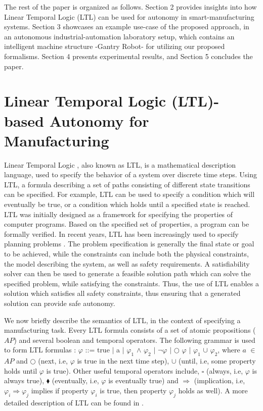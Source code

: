 \documentclass[3p,twocolumn,times,procedia]{elsarticle}
\begin{document}
The rest of the paper is organized as follows. Section 2  provides insights into how Linear Temporal Logic (LTL) can be used for autonomy in smart-manufacturing systems. Section 3  showcases an example use-case of the proposed approach, in an autonomous industrial-automation laboratory setup, which contains an intelligent machine structure -Gantry Robot- for utilizing our proposed formalisms. Section 4 presents experimental results, and Section 5 concludes the paper.
\vspace{-10pt}
\section{Linear Temporal Logic (LTL)-based Autonomy for Manufacturing} \label{sec:ltl-autonomy}
Linear Temporal Logic \cite{LTL}, also known as LTL, is a mathematical description language, used to specify the behavior of a system over discrete time steps. Using LTL, a formula describing a set of paths consisting of different state transitions can be specified. For example, LTL can be used to specify a condition which will eventually be true, or a condition which holds until a specified state is reached. LTL was initially designed as a framework for specifying the properties of computer programs. Based on the specified set of properties, a program can be formally verified. In recent years, LTL has been increasingly used to specify planning problems \cite{ltl-planning}. The problem specification is generally the final state or goal to be achieved, while the constraints can include both the physical constraints, the model describing the system, as well as safety requirements. A satisfiability solver can then be used to generate a feasible solution path which can solve the specified problem, while satisfying the constraints. %
Thus, the use of LTL enables a solution which satisfies all safety constraints, thus ensuring that a generated solution can provide safe autonomy.

We now briefly describe the semantics of LTL, in the context of specifying a manufacturing task.  Every LTL formula consists of a set of atomic propositions ($AP$) and several boolean and temporal operators. The following grammar is used to form LTL formulas \cite{model-book}: $\varphi$ ::= true $|$ a $|$ $\varphi_1$ $\wedge$ $\varphi_2$ $|$ $\neg$$\varphi$ $|$ $\bigcirc$ $\varphi$ $|$ $\varphi_1$ $\cup$ $\varphi_2$, where $a$ $\in$ $AP$ and $\bigcirc$ (next, i.e, $\varphi$ is true in the next time step), $\cup$ (until, i.e, some property holds until $\varphi$ is true). Other useful temporal operators include, $\square$  (always, i.e, $\varphi$ is always true), $\blacklozenge$ (eventually, i.e, $\varphi$ is eventually true) and $\Rightarrow$ (implication, i.e, $\varphi_i \Rightarrow \varphi_j$ implies if property $\varphi_i$ is true, then property $\varphi_j$ holds as well). A more detailed description of LTL can be found in \cite{model-book}.
\end{document}
